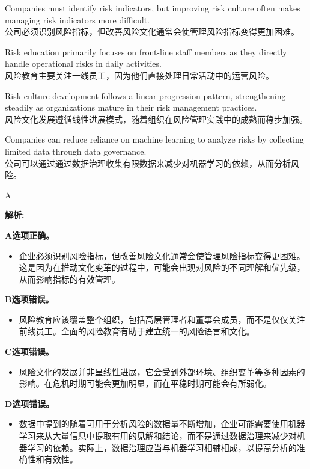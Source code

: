 \documentclass{article}
\newenvironment{explanation}
{\textbf{解析:}\par}
{\par}
\begin{document}
\begin{choices}
    \item Companies must identify risk indicators, but improving risk culture often makes managing risk indicators more difficult.  \\
    公司必须识别风险指标，但改善风险文化通常会使管理风险指标变得更加困难。
    \item Risk education primarily focuses on front-line staff members as they directly handle operational risks in daily activities.  \\
    风险教育主要关注一线员工，因为他们直接处理日常活动中的运营风险。
    \item Risk culture development follows a linear progression pattern, strengthening steadily as organizations mature in their risk management practices.  \\
    风险文化发展遵循线性进展模式，随着组织在风险管理实践中的成熟而稳步加强。
    \item Companies can reduce reliance on machine learning to analyze risks by collecting limited data through data governance.  \\
    公司可以通过通过数据治理收集有限数据来减少对机器学习的依赖，从而分析风险。
\end{choices}

\begin{correctanswer}
A
\end{correctanswer}

\begin{explanation}
    \textbf{A选项正确。}
    \begin{itemize}
        \item 企业必须识别风险指标，但改善风险文化通常会使管理风险指标变得更困难。这是因为在推动文化变革的过程中，可能会出现对风险的不同理解和优先级，从而影响指标的有效管理。
    \end{itemize}

    \textbf{B选项错误。}
    \begin{itemize}
        \item 风险教育应该覆盖整个组织，包括高层管理者和董事会成员，而不是仅仅关注前线员工。全面的风险教育有助于建立统一的风险语言和文化。
    \end{itemize}

    \textbf{C选项错误。}
    \begin{itemize}
        \item 风险文化的发展并非呈线性进展，它会受到外部环境、组织变革等多种因素的影响。在危机时期可能会更加明显，而在平稳时期可能会有所弱化。
    \end{itemize}

    \textbf{D选项错误。}
    \begin{itemize}
        \item 数据中提到的随着可用于分析风险的数据量不断增加，企业可能需要使用机器学习来从大量信息中提取有用的见解和结论，而不是通过数据治理来减少对机器学习的依赖。实际上，数据治理应当与机器学习相辅相成，以提高分析的准确性和有效性。
    \end{itemize}
\end{explanation}
\end{document}
